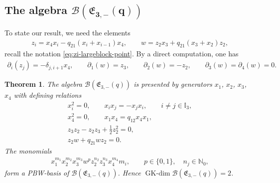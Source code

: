 \documentclass[pdftex]{sigma}
\numberwithin{equation}{section}
\newtheorem{Theorem}{Theorem}[section]
\newcommand{\GK}{\operatorname{GK-dim}}
\newcommand{\toba}{\mathscr B}
\newcommand{\I}{{\mathbb I}}
\newcommand{\N}{{\mathbb N}}
\newcommand{\eny}{\mathfrak{E}}
\begin{document}
\subsection[The algebra B(E\_{3,-}(q))]{The algebra $\boldsymbol{\toba(\eny_{3,-}(q))}$}
To state our result, we need the elements
\begin{align*}
z_{i} = x_4x_i - q _{21} (x_i+x_{i-1}) x_4,\qquad
w = z_2x_3 + q_{21} (x_3+x_2) z_2,
\end{align*}
recall the notation \eqref{eq:zi-largeblock-point}.
By a direct computation, one has
\begin{align*}
\partial_i(z_{j}) = -\delta_{j,i+1}x_4,\qquad
\partial_1(w) =z_3, \qquad \partial_2(w) =-z_2,\qquad \partial_3(w) =\partial_4(w) =0.
\end{align*}

\begin{Theorem}\label{thm:q=1,q22=-1,n=3} The algebra
$\toba(\eny_{3,-}(q))$ is presented by generators $x_1$,
$x_2$, $x_3$, $x_4$ with defining relations
\begin{gather}\label{eq:endymion3-1-1}
x_i^2=0,\qquad x_ix_j = -x_jx_i, \qquad i\ne j\in\I_3,
\\ \label{eq:endymion3-1-2}
x_4^2=0,\qquad x_1x_4 = q_{12} x_4x_1,
\\ \label{eq:endymion3-1-3}
z_3z_2-z_2z_3+\tfrac{1}{2}z_2^2=0,
\\ \label{eq:endymion3-1-4}
z_2w+q_{21}wz_2=0.
\end{gather}
The monomials
\begin{align}\label{eq:monomials-eny3-}
x_1^{m_1} x_2^{m_2} x_3^{m_3} w^{p} z_2^{n_2}z_{3}^{n_3} x_4^{m_4}
m_i, \qquad p \in \{0,1\}, \quad n_j \in\N_0,
\end{align}
form a PBW-basis of $\toba(\eny_{3,-}(q))$. Hence $\GK \toba(\eny_{3,-}(q)) = 2$.
\end{Theorem}
\end{document}
